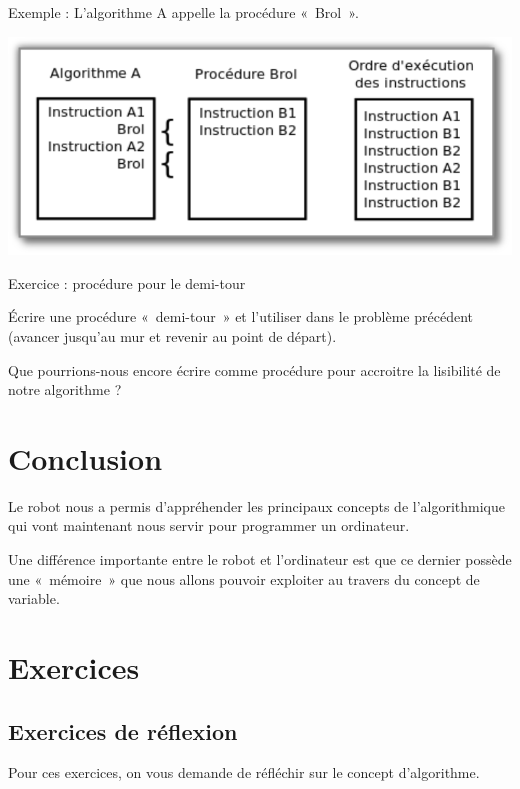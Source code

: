 	Exemple : L'algorithme A appelle la procédure «~Brol~».

	\begin{center}
	\includegraphics[width=\textwidth]{image/robot-procedure}
	\end{center}

	\begin{Emphase}{Exercice : procédure pour le demi-tour}
	
		Écrire une procédure «~demi-tour~» et l'utiliser dans
		le problème précédent (avancer jusqu'au mur et revenir
		au point de départ).
		
		Que pourrions-nous encore écrire comme procédure pour accroitre
		la lisibilité de notre algorithme ?

	\end{Emphase}

\section{Conclusion}

	Le robot nous a permis d'appréhender les principaux
	concepts de l'algorithmique qui vont maintenant nous
	servir pour programmer un ordinateur. 
	
	Une différence importante entre le robot et
	l'ordinateur est que ce dernier possède une
	«~mémoire~» que nous allons pouvoir exploiter au travers du concept de
	variable.

\section{Exercices}

	\subsection{Exercices de réflexion}

		Pour ces exercices, on vous demande de réfléchir sur le concept
		d'algorithme.

